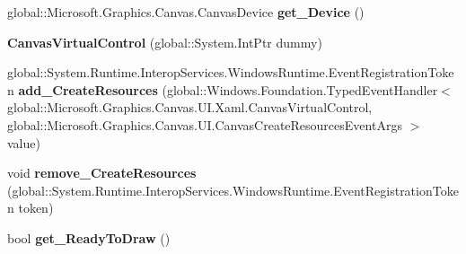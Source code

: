 \begin{DoxyCompactItemize}
\item 
\mbox{\label{class_microsoft_1_1_graphics_1_1_canvas_1_1_u_i_1_1_xaml_1_1_canvas_virtual_control_a81a72cc0fa39cc066e7b2ebe1c69c058}} 
global\+::\+Microsoft.\+Graphics.\+Canvas.\+Canvas\+Device {\bfseries get\+\_\+\+Device} ()
\item 
\mbox{\label{class_microsoft_1_1_graphics_1_1_canvas_1_1_u_i_1_1_xaml_1_1_canvas_virtual_control_a09dd36cea5da7f54fbb16a91d4df4e72}} 
{\bfseries Canvas\+Virtual\+Control} (global\+::\+System.\+Int\+Ptr dummy)
\item 
\mbox{\label{class_microsoft_1_1_graphics_1_1_canvas_1_1_u_i_1_1_xaml_1_1_canvas_virtual_control_a4223ddace384a3165f478a4d7db7b73a}} 
global\+::\+System.\+Runtime.\+Interop\+Services.\+Windows\+Runtime.\+Event\+Registration\+Token {\bfseries add\+\_\+\+Create\+Resources} (global\+::\+Windows.\+Foundation.\+Typed\+Event\+Handler$<$ global\+::\+Microsoft.\+Graphics.\+Canvas.\+U\+I.\+Xaml.\+Canvas\+Virtual\+Control, global\+::\+Microsoft.\+Graphics.\+Canvas.\+U\+I.\+Canvas\+Create\+Resources\+Event\+Args $>$ value)
\item 
\mbox{\label{class_microsoft_1_1_graphics_1_1_canvas_1_1_u_i_1_1_xaml_1_1_canvas_virtual_control_a12628d4980246897d39f0971c3287ca0}} 
void {\bfseries remove\+\_\+\+Create\+Resources} (global\+::\+System.\+Runtime.\+Interop\+Services.\+Windows\+Runtime.\+Event\+Registration\+Token token)
\item 
\mbox{\label{class_microsoft_1_1_graphics_1_1_canvas_1_1_u_i_1_1_xaml_1_1_canvas_virtual_control_af6528db89b7f78c8130c559d594d8300}} 
bool {\bfseries get\+\_\+\+Ready\+To\+Draw} ()
\item 
\mbox{\label{class_microsoft_1_1_graphics_1_1_canvas_1_1_u_i_1_1_xaml_1_1_canvas_virtual_control_a4e2d94f4f40419484642f72168ab3bb1}} 

\end{DoxyCompactItemize}
